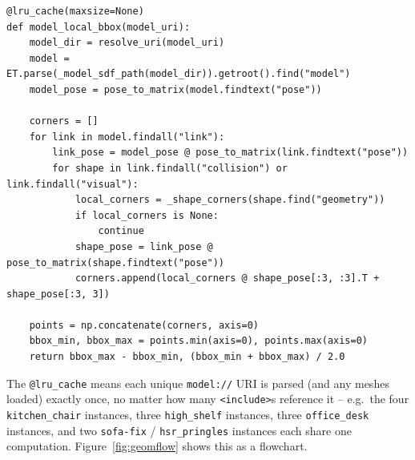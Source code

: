\documentclass[11pt]{article}
\begin{document}
\begin{lstlisting}[caption={\texttt{gazebo\_geometry.py}: \texttt{model\_local\_bbox} -- the core algorithm}]
@lru_cache(maxsize=None)
def model_local_bbox(model_uri):
    model_dir = resolve_uri(model_uri)
    model = ET.parse(_model_sdf_path(model_dir)).getroot().find("model")
    model_pose = pose_to_matrix(model.findtext("pose"))

    corners = []
    for link in model.findall("link"):
        link_pose = model_pose @ pose_to_matrix(link.findtext("pose"))
        for shape in link.findall("collision") or link.findall("visual"):
            local_corners = _shape_corners(shape.find("geometry"))
            if local_corners is None:
                continue
            shape_pose = link_pose @ pose_to_matrix(shape.findtext("pose"))
            corners.append(local_corners @ shape_pose[:3, :3].T + shape_pose[:3, 3])

    points = np.concatenate(corners, axis=0)
    bbox_min, bbox_max = points.min(axis=0), points.max(axis=0)
    return bbox_max - bbox_min, (bbox_min + bbox_max) / 2.0
\end{lstlisting}

The \texttt{@lru\_cache} means each unique \texttt{model://} URI is parsed
(and any meshes loaded) exactly once, no matter how many \texttt{<include>}s
reference it -- e.g.\ the four \texttt{kitchen\_chair} instances, three
\texttt{high\_shelf} instances, three \texttt{office\_desk} instances, and two
\texttt{sofa-fix} / \texttt{hsr\_pringles} instances each share one
computation. Figure~\ref{fig:geomflow} shows this as a flowchart.
\end{document}
